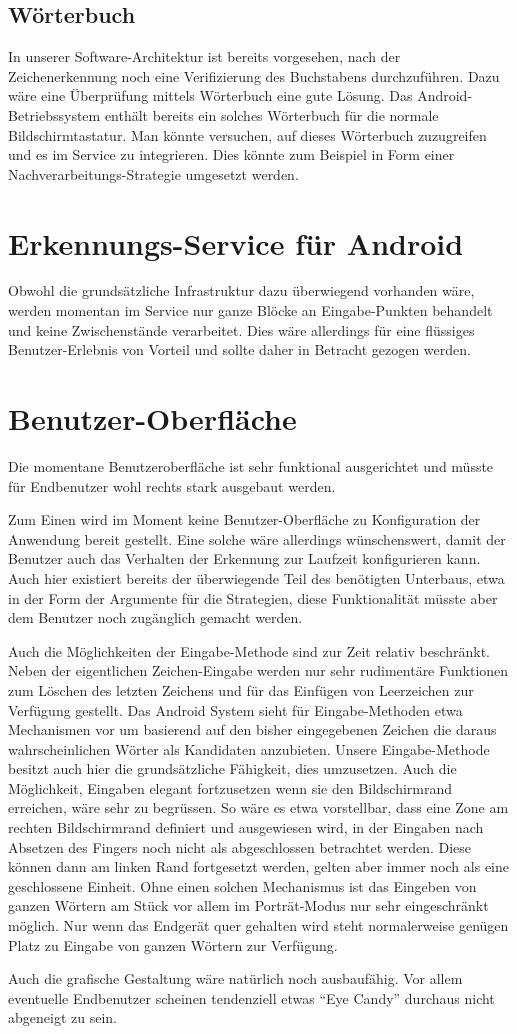 \subsection{Wörterbuch}
In unserer Software-Architektur ist bereits vorgesehen, nach der Zeichenerkennung noch eine Verifizierung des Buchstabens durchzuführen. Dazu wäre eine Überprüfung mittels Wörterbuch eine gute Lösung. Das Android-Betriebssystem enthält bereits ein solches Wörterbuch für die normale Bildschirmtastatur. Man könnte versuchen, auf dieses Wörterbuch zuzugreifen und es im Service zu integrieren. Dies könnte zum Beispiel in Form einer Nachverarbeitungs-Strategie umgesetzt werden.

\section{Erkennungs-Service für Android}
Obwohl die grundsätzliche Infrastruktur dazu überwiegend vorhanden wäre, werden momentan im Service nur ganze Blöcke an Eingabe-Punkten behandelt und keine Zwischenstände verarbeitet. Dies wäre allerdings für eine flüssiges Benutzer-Erlebnis von Vorteil und sollte daher in Betracht gezogen werden.

\section{Benutzer-Oberfläche}
Die momentane Benutzeroberfläche ist sehr funktional ausgerichtet und müsste für Endbenutzer wohl rechts stark ausgebaut werden.

Zum Einen wird im Moment keine Benutzer-Oberfläche zu Konfiguration der Anwendung bereit gestellt. Eine solche wäre allerdings wünschenswert, damit der Benutzer auch das Verhalten der Erkennung zur Laufzeit konfigurieren kann. Auch hier existiert bereits der überwiegende Teil des benötigten Unterbaus, etwa in der Form der Argumente für die Strategien, diese Funktionalität müsste aber dem Benutzer noch zugänglich gemacht werden.

Auch die Möglichkeiten der Eingabe-Methode sind zur Zeit relativ beschränkt. Neben der eigentlichen Zeichen-Eingabe werden nur sehr rudimentäre Funktionen zum Löschen des letzten Zeichens und für das Einfügen von Leerzeichen zur Verfügung gestellt. Das Android System sieht für Eingabe-Methoden etwa Mechanismen vor um basierend auf den bisher eingegebenen Zeichen die daraus wahrscheinlichen Wörter als Kandidaten anzubieten. Unsere Eingabe-Methode besitzt auch hier die grundsätzliche Fähigkeit, dies umzusetzen. Auch die Möglichkeit, Eingaben elegant fortzusetzen wenn sie den Bildschirmrand erreichen, wäre sehr zu begrüssen. So wäre es etwa vorstellbar, dass eine Zone am rechten Bildschirmrand definiert und ausgewiesen wird, in der Eingaben nach Absetzen des Fingers noch nicht als abgeschlossen betrachtet werden. Diese können dann am linken Rand fortgesetzt werden, gelten aber immer noch als eine geschlossene Einheit. Ohne einen solchen Mechanismus ist das Eingeben von ganzen Wörtern am Stück vor allem im Porträt-Modus nur sehr eingeschränkt möglich. Nur wenn das Endgerät quer gehalten wird steht normalerweise genügen Platz zu Eingabe von ganzen Wörtern zur Verfügung.

Auch die grafische Gestaltung wäre natürlich noch ausbaufähig. Vor allem eventuelle Endbenutzer scheinen tendenziell etwas ``Eye Candy'' durchaus nicht abgeneigt zu sein.
